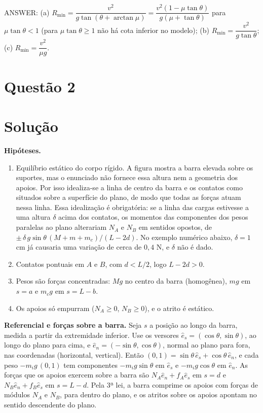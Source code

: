 \documentclass{article}%
\begin{document}
ANSWER: (a) $R_{\min}=\dfrac{v^2}{g\tan(\theta+\arctan\mu)}=\dfrac{v^2(1-\mu\tan\theta)}{g(\mu+\tan\theta)}$ para $\mu\tan\theta<1$ (para $\mu\tan\theta\ge 1$ não há cota inferior no modelo); (b) $R_{\min}=\dfrac{v^2}{g\tan\theta}$; (c) $R_{\min}=\dfrac{v^2}{\mu g}$.%
\newpage%
\section*{Questão 2}

\section*{Solução}

\textbf{Hipóteses.}
\begin{enumerate}
\item Equilíbrio estático do corpo rígido. A figura mostra a barra elevada sobre os suportes, mas o enunciado não fornece essa altura nem a geometria dos apoios. Por isso idealiza-se a linha de centro da barra e os contatos como situados sobre a superfície do plano, de modo que todas as forças atuam nessa linha. Essa idealização é obrigatória: se a linha das cargas estivesse a uma altura $\delta$ acima dos contatos, os momentos das componentes dos pesos paralelas ao plano alterariam $N_A$ e $N_B$ em sentidos opostos, de $\pm\,\delta\,g\sin\theta\,(M+m+m_c)/(L-2d)$. No exemplo numérico abaixo, $\delta=1$ cm já causaria uma variação de cerca de $0{,}4$ N, e $\delta$ não é dado.
\item Contatos pontuais em $A$ e $B$, com $d<L/2$, logo $L-2d>0$.
\item Pesos são forças concentradas: $Mg$ no centro da barra (homogênea), $mg$ em $s=a$ e $m_cg$ em $s=L-b$.
\item Os apoios só empurram ($N_A\ge 0$, $N_B\ge 0$), e o atrito é estático.
\end{enumerate}

\textbf{Referencial e forças sobre a barra.} Seja $s$ a posição ao longo da barra, medida a partir da extremidade inferior. Use os versores $\hat e_s=(\cos\theta,\sin\theta)$, ao longo do plano para cima, e $\hat e_n=(-\sin\theta,\cos\theta)$, normal ao plano para fora, nas coordenadas (horizontal, vertical). Então $(0,1)=\sin\theta\,\hat e_s+\cos\theta\,\hat e_n$, e cada peso $-m_i g\,(0,1)$ tem componentes $-m_i g\sin\theta$ em $\hat e_s$ e $-m_i g\cos\theta$ em $\hat e_n$. As forças que os apoios exercem sobre a barra são $N_A\hat e_n+f_A\hat e_s$ em $s=d$ e $N_B\hat e_n+f_B\hat e_s$ em $s=L-d$. Pela 3ª lei, a barra comprime os apoios com forças de módulos $N_A$ e $N_B$, para dentro do plano, e os atritos sobre os apoios apontam no sentido descendente do plano.
\end{document}
